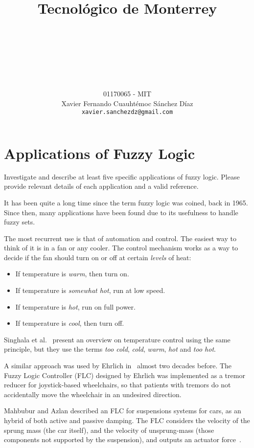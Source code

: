 \documentclass[titlepage, letterpaper, fleqn]{article}
\title{
\vspace{1in}
\textbf{Tecnológico de Monterrey} \\
\vspace{0.5in}
\textmd{\mahclass} \\
\vspace{0.5in}
\large{\textit{\mahteacher}} \\
\vspace{0.5in}
\textsc{\mahtitle}\\
\author{01170065  - MIT \\
Xavier Fernando Cuauhtémoc Sánchez Díaz \\
\texttt{xavier.sanchezdz@gmail.com}}
\date{\mahdate}
}
\newcommand{\spacepls}{\vspace{5mm}}
\begin{document}
\begin{titlepage}
\maketitle
\end{titlepage}

%
%

\section{Applications of Fuzzy Logic}

{\large Investigate and describe at least five specific applications of fuzzy logic.
Please provide relevant details of each application and a valid reference.}

\spacepls

It has been quite a long time since the term fuzzy logic was coined, back in 1965.
Since then, many applications have been found due to its usefulness to handle fuzzy sets.

The most recurrent use is that of automation and control.
The easiest way to think of it is in a fan or any cooler.
The control mechanism works as a way to decide if the fan should turn on or off at certain \textit{levels} of heat:
\begin{itemize}
  \item If temperature is \textit{warm}, then turn on.
  \item If temperature is \textit{somewhat hot}, run at low speed.
  \item If temperature is \textit{hot}, run on full power.
  \item If temperature is \textit{cool}, then turn off.
\end{itemize}

Singhala et al.~\cite{Singhala14} present an overview on temperature control using the same principle, but they use the terms \textit{too cold}, \textit{cold}, \textit{warm}, \textit{hot} and \textit{too hot}.

A similar approach was used by Ehrlich in~\cite{Ehrlich95} almost two decades before.
The Fuzzy Logic Controller (FLC) designed by Ehrlich was implemented as a tremor reducer for joystick-based wheelchairs, so that patients with tremors do not accidentally move the wheelchair in an undesired direction.

Mahbubur and Azlan described an FLC for suspensions systems for cars, as an hybrid of both active and passive damping.
The FLC considers the velocity of the sprung mass (the car itself), and the velocity of unsprung-mass (those components not supported by the suspension), and outputs an actuator force~\cite{Mahbubur12}.
\end{document}
